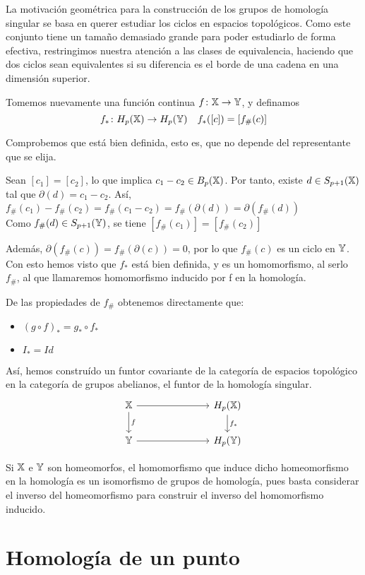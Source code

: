 La motivación geométrica para la construcción de los grupos de homología singular se basa en querer
estudiar los ciclos en espacios topológicos. Como este conjunto tiene un tamaño demasiado grande para
poder estudiarlo de forma efectiva, restringimos nuestra atención a las clases de equivalencia, haciendo
que dos ciclos sean equivalentes si su diferencia es el borde de una cadena en una dimensión superior.

Tomemos nuevamente una función continua $f \colon {\mathbb X} \to {\mathbb Y}$, y definamos
\[ f_* \colon H_p({\mathbb X}) \to H_p({\mathbb Y}) \quad f_*([c]) = [f_\#(c)]  \]

Comprobemos que está bien definida, esto es, que no depende del representante que se elija.

Sean $[c_1] = [c_2]$, lo que implica $c_1 - c_2 \in B_p({\mathbb X})$. Por tanto, existe $d \in S_{p+1}({\mathbb X})$ tal que $\partial(d) = c_1 - c_2$.
Así, $f_\#(c_1) - f_\#(c_2) = f_\#(c_1 - c_2) = f_\#(\partial(d)) = \partial(f_\#(d))$ \\
Como $f_\#(d) \in S_{p+1}({\mathbb Y})$, se tiene $[f_\#(c_1)] = [f_\#(c_2)]$

Además, $\partial(f_\#(c)) = f_\#(\partial(c)) = 0$, por lo que $f_\#(c)$ es un ciclo en ${\mathbb Y}$. Con esto hemos visto que $f_*$ está bien definida,
y es un homomorfismo, al serlo $f_\#$, al que llamaremos homomorfismo inducido por f en la homología.

De las propiedades de $f_\#$ obtenemos directamente que:
\begin{itemize}
  \item $(g \circ f)_* = g_* \circ f_*$
  \item $I_* = Id$
\end{itemize}

Así, hemos construído un funtor covariante de la categoría de espacios topológico en la categoría de grupos abelianos,
el funtor de la homología singular.
\[  \begin{tikzcd}
  \X \arrow{r} \arrow{d}{f} & [5em] H_p(\X) \arrow{d}{f_*} \\
  \Y \arrow{r}  & H_p(\Y)
\end{tikzcd} \]

Si ${\mathbb X}$ e ${\mathbb Y}$ son homeomorfos, el homomorfismo que induce dicho homeomorfismo en la homología es un isomorfismo de grupos de homología, pues
basta considerar el inverso del homeomorfismo para construir el inverso del homomorfismo inducido.

\section{Homología de un punto}

